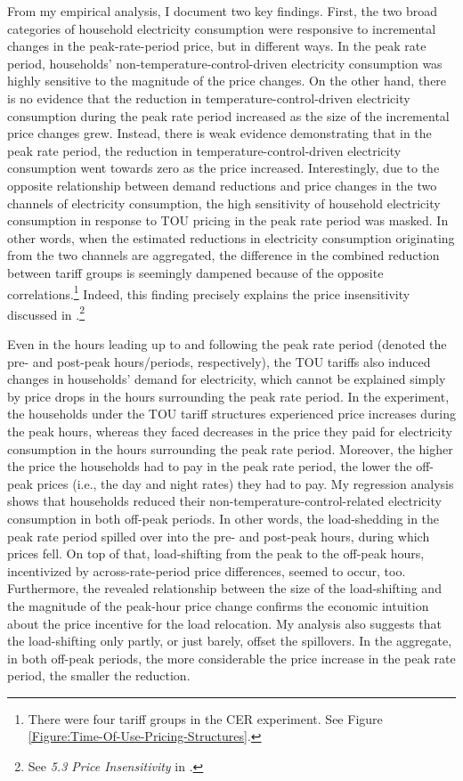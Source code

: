 From my empirical analysis, I document two key findings. First, the two broad categories of household electricity consumption were responsive to incremental changes in the peak-rate-period price, but in different ways. In the peak rate period, households' non-temperature-control-driven electricity consumption was highly sensitive to the magnitude of the price changes. On the other hand, there is no evidence that the reduction in temperature-control-driven electricity consumption during the peak rate period increased as the size of the incremental price changes grew. Instead, there is weak evidence demonstrating that in the peak rate period, the reduction in temperature-control-driven electricity consumption went towards zero as the price increased. Interestingly, due to the opposite relationship between demand reductions and price changes in the two channels of electricity consumption, the high sensitivity of household electricity consumption in response to TOU pricing in the peak rate period was masked. In other words, when the estimated reductions in electricity consumption originating from the two channels are aggregated, the difference in the combined reduction between tariff groups is seemingly dampened because of the opposite correlations.\footnote{There were four tariff groups in the CER experiment. See Figure \ref{Figure:Time-Of-Use-Pricing-Structures}.} Indeed, this finding precisely explains the price insensitivity discussed in \cite{Peaking-Interest:How-Awareness-Drives-the-Effectiveness-of-Time-of-Use-Electricity-Pricing_Prest_2020}.\footnote{See \textit{5.3 Price Insensitivity} in \cite{Peaking-Interest:How-Awareness-Drives-the-Effectiveness-of-Time-of-Use-Electricity-Pricing_Prest_2020}.}  

Even in the hours leading up to and following the peak rate period (denoted the pre- and post-peak hours/periods, respectively), the TOU tariffs also induced changes in households' demand for electricity, which cannot be explained simply by price drops in the hours surrounding the peak rate period. In the experiment, the households under the TOU tariff structures experienced price increases during the peak hours, whereas they faced decreases in the price they paid for electricity consumption in the hours surrounding the peak rate period. Moreover, the higher the price the households had to pay in the peak rate period, the lower the off-peak prices (i.e., the day and night rates) they had to pay. My regression analysis shows that households reduced their non-temperature-control-related electricity consumption in both off-peak periods. In other words, the load-shedding in the peak rate period spilled over into the pre- and post-peak hours, during which prices fell. On top of that, load-shifting from the peak to the off-peak hours, incentivized by across-rate-period price differences, seemed to occur, too. Furthermore, the revealed relationship between the size of the load-shifting and the magnitude of the peak-hour price change confirms the economic intuition about the price incentive for the load relocation. My analysis also suggests that the load-shifting only partly, or just barely, offset the spillovers. In the aggregate, in both off-peak periods, the more considerable the price increase in the peak rate period, the smaller the reduction.

